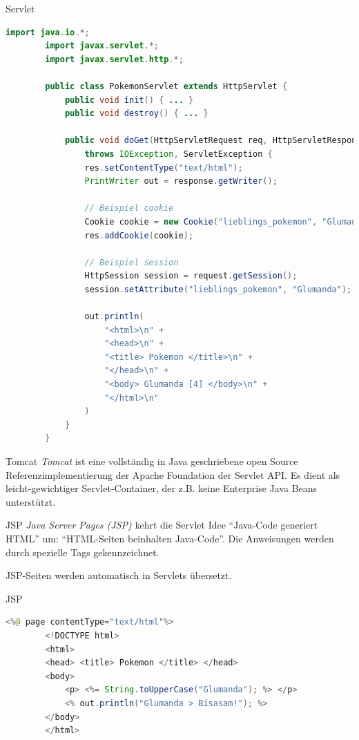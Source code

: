 \begin{example}{Servlet}
    \begin{lstlisting}[language=Java]
        import java.io.*;
        import javax.servlet.*;
        import javax.servlet.http.*;

        public class PokemonServlet extends HttpServlet {
            public void init() { ... }
            public void destroy() { ... }

            public void doGet(HttpServletRequest req, HttpServletResponse res)
                throws IOException, ServletException {
                res.setContentType("text/html");
                PrintWriter out = response.getWriter();

                // Beispiel cookie
                Cookie cookie = new Cookie("lieblings_pokemon", "Glumanda");
                res.addCookie(cookie);

                // Beispiel session
                HttpSession session = request.getSession();
                session.setAttribute("lieblings_pokemon", "Glumanda");
                
                out.println(
                    "<html>\n" +
                    "<head>\n" +
                    "<title> Pokemon </title>\n" +
                    "</head>\n" +
                    "<body> Glumanda [4] </body>\n" +
                    "</html>\n"
                )
            }
        }
    \end{lstlisting}
\end{example}

\begin{defi}{Tomcat}
    \emph{Tomcat} ist eine vollständig in Java geschriebene open Source Referenzimplementierung der Apache Foundation der Servlet API.
    Es dient als leicht-gewichtiger Servlet-Container, der z.B. keine Enterprise Java Beans unterstützt.
\end{defi}

\begin{defi}{JSP}
    \emph{Java Server Pages (JSP)} kehrt die Servlet Idee \enquote{Java-Code generiert HTML} um: \enquote{HTML-Seiten beinhalten Java-Code}.
    Die Anweisungen werden durch spezielle Tags gekennzeichnet.

    JSP-Seiten werden automatisch in Servlets übersetzt.
\end{defi}

\begin{example}{JSP}
    \begin{lstlisting}[language=Java]
        <%@ page contentType="text/html"%>
        <!DOCTYPE html>
        <html>
        <head> <title> Pokemon </title> </head>
        <body>
            <p> <%= String.toUpperCase("Glumanda"); %> </p>
            <% out.println("Glumanda > Bisasam!"); %>
        </body>
        </html>
    \end{lstlisting}
\end{example}

